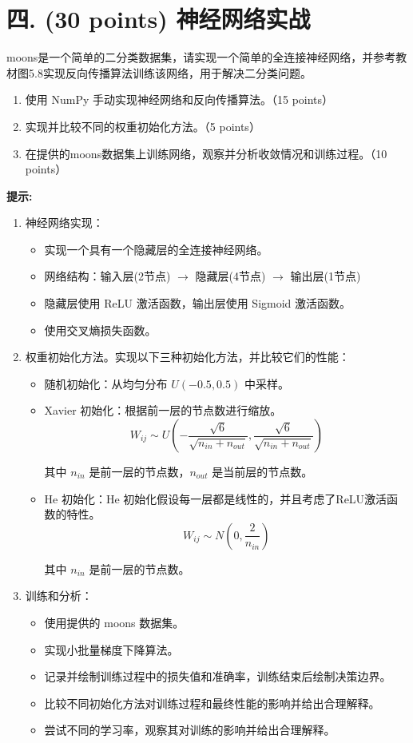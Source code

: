 \documentclass[8pt]{article}
\begin{document}
\vspace{3em}

\section*{四. (30 points) 神经网络实战}

moons是一个简单的二分类数据集，请实现一个简单的全连接神经网络，并参考教材图5.8实现反向传播算法训练该网络，用于解决二分类问题。
\begin{enumerate}
    \item 使用 NumPy 手动实现神经网络和反向传播算法。（15 points）
    \item 实现并比较不同的权重初始化方法。（5 points）
    \item 在提供的moons数据集上训练网络，观察并分析收敛情况和训练过程。（10 points）
\end{enumerate}

\textbf{提示:}

\begin{enumerate}
    \item 神经网络实现：
\begin{itemize}
    \item 实现一个具有一个隐藏层的全连接神经网络。
    \item 网络结构：输入层(2节点) $\rightarrow$ 隐藏层(4节点) $\rightarrow$ 输出层(1节点)
    \item 隐藏层使用 ReLU 激活函数，输出层使用 Sigmoid 激活函数。
    \item 使用交叉熵损失函数。
\end{itemize}
    \item 权重初始化方法。实现以下三种初始化方法，并比较它们的性能：
\begin{itemize}
    \item 随机初始化：从均匀分布 $U(-0.5, 0.5)$ 中采样。
    \item Xavier 初始化：根据前一层的节点数进行缩放。
    \[ W_{ij} \sim U\left( -\frac{\sqrt{6}}{\sqrt{n_{in} + n_{out}}}, \frac{\sqrt{6}}{\sqrt{n_{in} + n_{out}}} \right) \]

其中 \(n_{in}\) 是前一层的节点数，\(n_{out}\) 是当前层的节点数。
    \item He 初始化：He 初始化假设每一层都是线性的，并且考虑了ReLU激活函数的特性。\[ W_{ij} \sim N\left( 0, \frac{2}{n_{in}} \right) \]

其中 \(n_{in}\) 是前一层的节点数。
\end{itemize}
    \item 训练和分析：
\begin{itemize}
    \item 使用提供的 moons 数据集。
    \item 实现小批量梯度下降算法。
    \item 记录并绘制训练过程中的损失值和准确率，训练结束后绘制决策边界。
    \item 比较不同初始化方法对训练过程和最终性能的影响并给出合理解释。
    \item 尝试不同的学习率，观察其对训练的影响并给出合理解释。
\end{itemize}
\end{enumerate}
\end{document}
